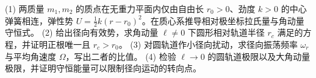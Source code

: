 (1) 两质量 \(m_1,m_2\) 的质点在无重力平面内仅由自由长 \(r_0>0\)、劲度 \(k>0\) 的中心弹簧相连，弹性势 \(U=\tfrac12 k(r-r_0)^2\)。在质心系推导相对极坐标拉氏量与角动量守恒式。
(2) 给出径向有效势，求角动量 \(\ell\ne0\) 下圆形相对轨道半径 \(r_c\) 满足的方程，并证明正根唯一且 \(r_c>r_0\)。
(3) 对圆轨道作小径向扰动，求径向振荡频率 \(\omega_r\) 与平均角速度 \(\Omega\)，写出二者的比值。
(4) 检验 \(\ell\to0\) 的圆轨道极限以及大角动量极限，并证明守恒能量可以限制径向运动的转向点。
